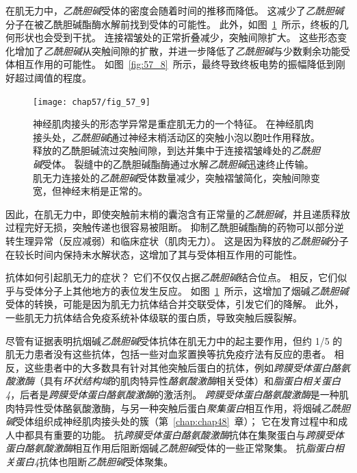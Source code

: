 在肌无力中，\textit{乙酰胆碱}受体的密度会随着时间的推移而降低。
这减少了\textit{乙酰胆碱}分子在被乙酰胆碱酯酶水解前找到受体的可能性。
此外，如图~\ref{fig:57_9}~所示，终板的几何形状也会受到干扰。
连接褶皱处的正常折叠减少，突触间隙扩大。
这些形态变化增加了\textit{乙酰胆碱}从突触间隙的扩散，并进一步降低了\textit{乙酰胆碱}与少数剩余功能受体相互作用的可能性。
如图~\ref{fig:57_8}~所示，最终导致终板电势的振幅降低到刚好超过阈值的程度。


\begin{figure}[htbp]
	\centering
	\texttt{[image: chap57/fig\_57\_9]}
	\caption{神经肌肉接头的形态学异常是重症肌无力的一个特征。
		在神经肌肉接头处，\textit{乙酰胆碱}通过神经末梢活动区的突触小泡以胞吐作用释放。
		释放的乙酰胆碱流过突触间隙，到达并集中于连接褶皱峰处的\textit{乙酰胆碱}受体。
		裂缝中的乙酰胆碱酯酶通过水解\textit{乙酰胆碱}迅速终止传输。
		肌无力连接处的\textit{乙酰胆碱}受体数量减少，突触褶皱简化，突触间隙变宽，但神经末梢是正常的。}
	\label{fig:57_9}
\end{figure}


因此，在肌无力中，即使突触前末梢的囊泡含有正常量的\textit{乙酰胆碱}，并且递质释放过程完好无损，突触传递也很容易被阻断。
抑制乙酰胆碱酯酶的药物可以部分逆转生理异常（反应减弱）和临床症状（肌肉无力）。
这是因为释放的\textit{乙酰胆碱}分子在较长时间内保持未水解状态，这增加了其与受体相互作用的可能性。


抗体如何引起肌无力的症状？
它们不仅仅占据\textit{乙酰胆碱}结合位点。
相反，它们似乎与受体分子上其他地方的表位发生反应。
如图~\ref{fig:57_9}~所示，这增加了烟碱\textit{乙酰胆碱}受体的转换，可能是因为肌无力抗体结合并交联受体，引发它们的降解。
此外，一些肌无力抗体结合免疫系统补体级联的蛋白质，导致突触后膜裂解。


尽管有证据表明抗烟碱\textit{乙酰胆碱}受体抗体在肌无力中的起主要作用，但约 1/5 的肌无力患者没有这些抗体，包括一些对血浆置换等抗免疫疗法有反应的患者。
相反，这些患者中的大多数具有针对其他突触后蛋白的抗体，例如\textit{跨膜受体蛋白酪氨酸激酶}（具有\textit{环状结构域}的肌肉特异性\textit{酪氨酸激酶}相关受体）和\textit{脂蛋白相关蛋白4}，后者是\textit{跨膜受体蛋白酪氨酸激酶}的激活剂。
\textit{跨膜受体蛋白酪氨酸激酶}是一种肌肉特异性受体酪氨酸激酶，与另一种突触后蛋白\textit{聚集蛋白}相互作用，将烟碱\textit{乙酰胆碱}受体组织成神经肌肉接头处的簇（第~\ref{chap:chap48}~章）；
它在发育过程中和成人中都具有重要的功能。
抗\textit{跨膜受体蛋白酪氨酸激酶}抗体在集聚蛋白与\textit{跨膜受体蛋白酪氨酸激酶}相互作用后阻断烟碱\textit{乙酰胆碱}受体的一些正常聚集。
抗\textit{脂蛋白相关蛋白4}抗体也阻断\textit{乙酰胆碱}受体聚集。



